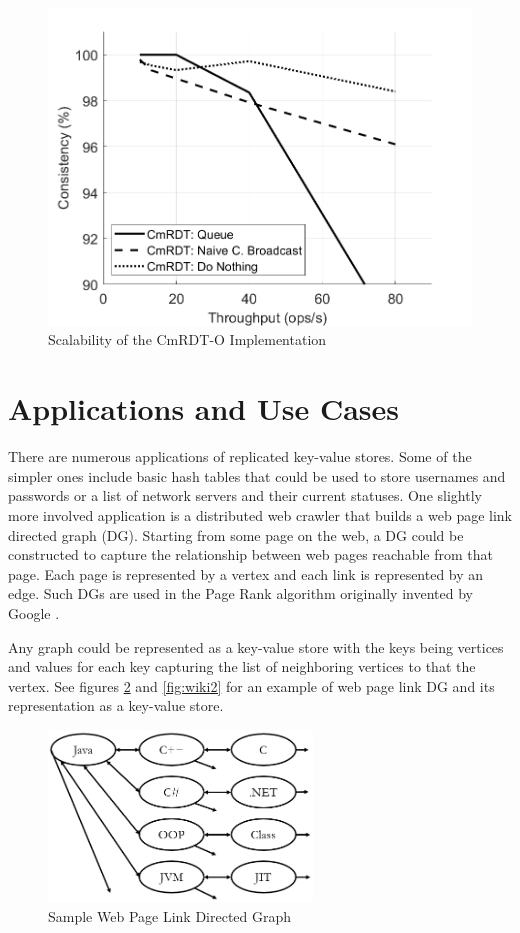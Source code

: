 \documentclass[sigconf,nonacm,11pt]{acmart}
\begin{document}
\begin{figure}[h]
  \centering
  \includegraphics[width=\linewidth]{Fig9Eval3}
  \caption{Scalability of the CmRDT-O Implementation}
  \label{fig:eval3}
\end{figure}

\section{Applications and Use Cases}
There are numerous applications of replicated key-value stores. Some of the simpler ones include basic hash tables that could be used to store usernames and passwords or a list of network servers and their current statuses. One slightly more involved application is a distributed web crawler that builds a web page link directed graph (DG). Starting from some page on the web, a DG could be constructed to capture the relationship between web pages reachable from that page. Each page is represented by a vertex and each link is represented by an edge. Such DGs are used in the Page Rank algorithm originally invented by Google \cite{brin1998anatomy}.

Any graph could be represented as a key-value store with the keys being vertices and values for each key capturing the list of neighboring vertices to that the vertex. See figures \ref{fig:wiki1} and \ref{fig:wiki2} for an example of web page link DG and its representation as a key-value store.

\begin{figure}[h]
  \centering
  \includegraphics[width=7cm]{Fig11Wiki1}
  \caption{Sample Web Page Link Directed Graph}
  \label{fig:wiki1}
\end{figure}
\end{document}
